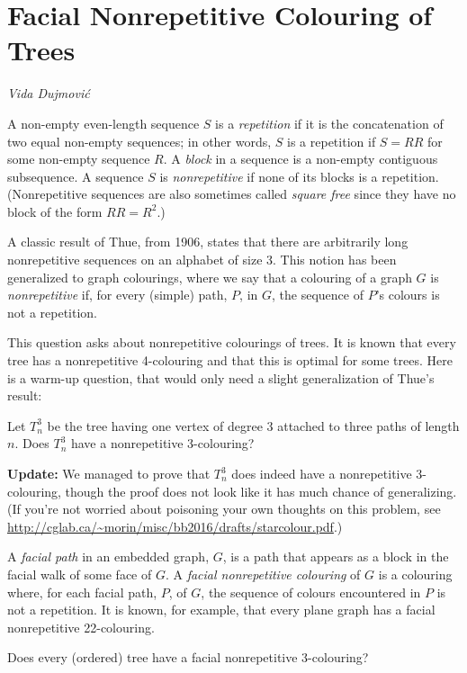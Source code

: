 \documentclass{patmorin}
\begin{document}
\section{Facial Nonrepetitive Colouring of Trees}

\noindent\emph{Vida Dujmovi\'c}

A non-empty even-length sequence $S$ is a \emph{repetition} if it is the
concatenation of two equal non-empty sequences; in other words, $S$ is
a repetition if $S=RR$ for some non-empty sequence $R$.  A \emph{block}
in a sequence is a non-empty contiguous subsequence.  A sequence $S$ is
\emph{nonrepetitive} if none of its blocks is a repetition. (Nonrepetitive
sequences are also sometimes called \emph{square free} since they have
no block of the form $RR=R^2$.)

A classic result of Thue, from 1906, states that there are arbitrarily
long nonrepetitive sequences on an alphabet of size 3.  This notion has
been generalized to graph colourings, where we say that a colouring of
a graph $G$ is \emph{nonrepetitive} if, for every (simple) path, $P$,
in $G$, the sequence of $P$'s colours is not a repetition.

This question asks about nonrepetitive colourings of trees.  It is known
that every tree has a nonrepetitive 4-colouring and that this is optimal
for some trees. Here is a warm-up question, that would only need a slight
generalization of Thue's result:

\begin{op}
  Let $T^3_n$ be the tree having one vertex of degree 3 attached to three
  paths of length $n$.  Does $T^3_n$ have a nonrepetitive 3-colouring?
\end{op}

\noindent\textbf{Update:} We managed to prove that $T^3_n$
does indeed have a nonrepetitive 3-colouring, though the proof
does not look like it has much chance of generalizing.  (If you're
not worried about poisoning your own thoughts on this problem, see
\url{http://cglab.ca/~morin/misc/bb2016/drafts/starcolour.pdf}.)

A \emph{facial path} in an embedded graph, $G$, is a path that appears
as a block in the facial walk of some face of $G$.  A \emph{facial
nonrepetitive colouring} of $G$ is a colouring where, for each facial
path, $P$, of $G$, the sequence of colours encountered in $P$ is not
a repetition. It is known, for example, that every plane graph has a
facial nonrepetitive 22-colouring.

\begin{op}
  Does every (ordered) tree have a facial nonrepetitive 3-colouring? 
\end{op}
\end{document}
